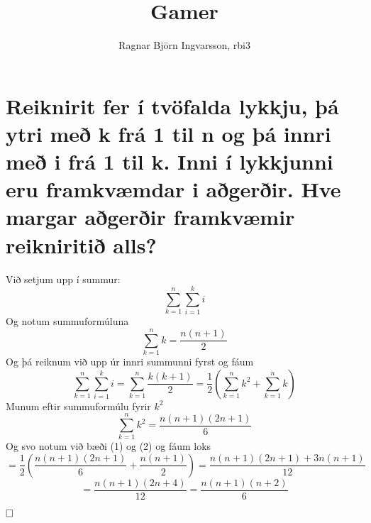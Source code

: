 \documentclass{article}
\title{Gamer}
\author{Ragnar Björn Ingvarsson, rbi3}
\begin{document}
\renewcommand\thepage{}

	\maketitle

	\newpage
	\setcounter{page}{1}
	\renewcommand\thepage{\arabic{page}}

	\section{}
	\section{Reiknirit fer í tvöfalda lykkju, þá ytri með k frá 1 til n og þá innri með i frá 1 til k. Inni í lykkjunni eru framkvæmdar i aðgerðir. Hve margar aðgerðir framkvæmir reikniritið alls?}
	Við setjum upp í summur:
	\[
		\sum_{k=1}^{n}\sum_{i=1}^k i
	\]
	Og notum summuformúluna
	\begin{equation}
		\sum_{k=1}^n k = \frac{n(n+1)}{2}
		\label{eq:gamer1}
	\end{equation}
	Og þá reiknum við upp úr innri summunni fyrst og fáum
	\[
		\sum_{k=1}^{n}\sum_{i=1}^k i = \sum_{k=1}^n \frac{k(k+1)}{2}
		= \frac{1}{2}\left(\sum_{k=1}^n k^2 + \sum_{k=1}^n k\right)
	\]
	Munum eftir summuformúlu fyrir $k^2$
	\begin{equation}
		\sum_{k=1}^n k^2 = \frac{n(n+1)(2n+1)}{6}
		\label{eq:gamer2}
	\end{equation}
	Og svo notum við bæði (1) og (2) og fáum loks
	\[
		= \frac{1}{2}\left( \frac{n(n+1)(2n+1)}{6} + \frac{n(n+1)}{2}\right)
		= \frac{n(n+1)(2n+1) + 3n(n+1)}{12}
	\]
	\[
		= \frac{n(n+1)(2n+4)}{12} = \frac{n(n+1)(n+2)}{6} 
	\]

	\vspace{-1.5em}$\hfill\square$
\end{document}
